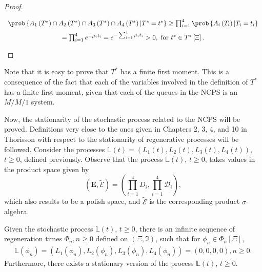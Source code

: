 \begin{proof}
\begin{itemize}
\begin{eqnarray}
\begin{array}{c}\medskip
\prob\left\{A_{1}\left(T^{*}\right)\cap A_{2}\left(T^{*}\right)\cap
A_{3}\left(T^{*}\right)\cap A_{4}\left(T^{*}\right)
|T^{*}=t^{*}\right\}\geq\prod_{i=1}^{4}
\prob\left\{A_{i}\left(T_{i}\right)
|T_{i}=t_{i}\right\}\\
=\prod_{i=1}^{4}e^{-\mu_{i}t_{i}}
=e^{-\sum_{i=1}^{4}\mu_{i}t_{i}}>0,\textrm{ for }t^{*}\in T^{*}\left[\Xi\right].
\end{array}
\end{eqnarray}
\end{itemize}%
\end{proof}
\begin{Remark}\label{Obs.Primer.Momento.Finito}
Note that it is easy to prove that $T^{*}$ has a finite first moment. This is a consequence of the fact that each of the variables involved in the definition of $T^{*}$ has a finite first moment, given that each of the queues in the NCPS is an $M/M/1$ system.
\end{Remark}
Now, the stationarity of the stochastic process related to the NCPS will be proved. Definitions very close to the ones given in Chapters 2, 3, 4, and 10 in Thorisson \cite{Thorisson} with respect to the stationarity of regenerative processes will be followed. Consider the processes $\mathbb{L}\left(t\right)=\left(L_{1}\left(t\right),L_{2}\left(t\right),L_{3}\left(t\right),L_{4}\left(t\right)\right)$, $t\geq0$, defined previously. Observe that the process $\mathbb{L}\left(t\right)$, $t\geq0$, takes values in the product space given by $$\left(\mathbf{E},\tilde{\mathcal{E}}\right)=\left(\prod_{i=1}^{4}D_{i},\prod_{i=1}^{4}\mathcal{D}_{i}\right),$$ which also results to be a polish space, and $\tilde{\mathcal{E}}$ is the corresponding product $\sigma$-algebra. 
\begin{Teo}\label{Tma.Stability.Regenerative.Process}
Given the stochastic process $\mathbb{L}\left(t\right)$, $t\geq0$, there is an infinite sequence of regeneration times $\Phi_{n},n\geq0$ defined on $\left(\Xi,\Im\right)$, such that for $\phi_{n}\in \Phi_{n}\left[\Xi\right]$,
\begin{eqnarray}\label{Eq.Regeneracion}
\mathbb{L}\left(\phi_{n}\right)=\left(L_{1}\left(\phi_{n}\right),L_{2}\left(\phi_{n}\right),L_{3}\left(\phi_{n}\right),L_{4}\left(\phi_{n}\right)\right)=\left(0,0,0,0\right),n\geq0.
\end{eqnarray}
Furthermore, there exists a stationary version of the process $\mathbb{L}\left(t\right)$, $t\geq0$.
\end{Teo}
